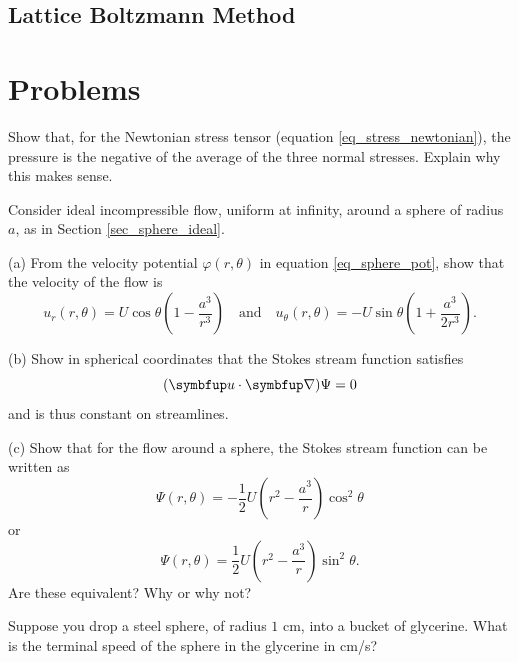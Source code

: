 \subsection{Lattice Boltzmann Method}



\section*{Problems}
%

\begin{problem}
\label{prob_pressure} 
Show that, for the Newtonian stress tensor (equation \ref{eq_stress_newtonian}), the pressure is the negative of the average of the three normal stresses.  Explain why this makes sense.
\end{problem}

\begin{problem}
\label{prob_sphere} 
Consider ideal incompressible flow, uniform at infinity, around a sphere of radius $a$, as in Section \ref{sec_sphere_ideal}.

(a) From the velocity potential $\varphi(r, \theta)$ in equation \ref{eq_sphere_pot}, show that the velocity of the flow is
\[
u_r (r, \theta) = U \cos \theta \left( 1 - \frac{a^3}{r^3} \right) \quad \text{and} \quad u_\theta(r, \theta) = -U \sin \theta \left( 1 + \frac{a^3}{2r^3} \right).
\]

(b) Show in spherical coordinates that the Stokes stream function satisfies
\[
(\vec{u} \cdot \grad) \Psi = 0
\]
and is thus constant on streamlines.

(c) Show that for the flow around a sphere, the Stokes stream function can be written as
\[
\Psi (r, \theta) = -\frac{1}{2} U \left( r^2 - \frac{a^3}{r} \right) \cos^2 \theta
\]
or
\[
\Psi (r, \theta) = \frac{1}{2} U \left( r^2 - \frac{a^3}{r} \right) \sin^2 \theta.
\]
Are these equivalent?  Why or why not?
\end{problem}



\begin{problem}
\label{prob_terminal_vel} 
Suppose you drop a steel sphere, of radius $1$ cm, into a bucket of glycerine.  What is the terminal speed of the sphere in the glycerine in cm/s?
\end{problem}




